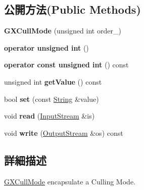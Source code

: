 \subsection*{公開方法(Public Methods)}
\begin{DoxyCompactItemize}
\item 
{\bfseries G\+X\+Cull\+Mode} (unsigned int order\+\_)\hypertarget{class_i_dream_sky_1_1_g_x_cull_mode_ac54ad0c7294d80cadc50fad0b095e089}{}\label{class_i_dream_sky_1_1_g_x_cull_mode_ac54ad0c7294d80cadc50fad0b095e089}

\item 
{\bfseries operator unsigned int} ()\hypertarget{class_i_dream_sky_1_1_g_x_cull_mode_acf351635c1e7199648d308dd3ff74009}{}\label{class_i_dream_sky_1_1_g_x_cull_mode_acf351635c1e7199648d308dd3ff74009}

\item 
{\bfseries operator const unsigned int} () const \hypertarget{class_i_dream_sky_1_1_g_x_cull_mode_a6b498cd6d202e4a28ef725a3ecf6d6c7}{}\label{class_i_dream_sky_1_1_g_x_cull_mode_a6b498cd6d202e4a28ef725a3ecf6d6c7}

\item 
unsigned int {\bfseries get\+Value} () const \hypertarget{class_i_dream_sky_1_1_g_x_cull_mode_a4e50a2c95a1efad1ea2989b3992b708d}{}\label{class_i_dream_sky_1_1_g_x_cull_mode_a4e50a2c95a1efad1ea2989b3992b708d}

\item 
bool {\bfseries set} (const \hyperlink{class_i_dream_sky_1_1_string}{String} \&value)\hypertarget{class_i_dream_sky_1_1_g_x_cull_mode_a91cb17191e891d7f9619a7b5f3e07d0c}{}\label{class_i_dream_sky_1_1_g_x_cull_mode_a91cb17191e891d7f9619a7b5f3e07d0c}

\item 
void {\bfseries read} (\hyperlink{class_i_dream_sky_1_1_input_stream}{Input\+Stream} \&is)\hypertarget{class_i_dream_sky_1_1_g_x_cull_mode_a0a7030c94ce4e513489ceb5e566309b8}{}\label{class_i_dream_sky_1_1_g_x_cull_mode_a0a7030c94ce4e513489ceb5e566309b8}

\item 
void {\bfseries write} (\hyperlink{class_i_dream_sky_1_1_output_stream}{Output\+Stream} \&os) const \hypertarget{class_i_dream_sky_1_1_g_x_cull_mode_aa20f94d2bcd2e01f217e5a627d3bd7fa}{}\label{class_i_dream_sky_1_1_g_x_cull_mode_aa20f94d2bcd2e01f217e5a627d3bd7fa}

\end{DoxyCompactItemize}


\subsection{詳細描述}
\hyperlink{class_i_dream_sky_1_1_g_x_cull_mode}{G\+X\+Cull\+Mode} encapsulate a Culling Mode. 

